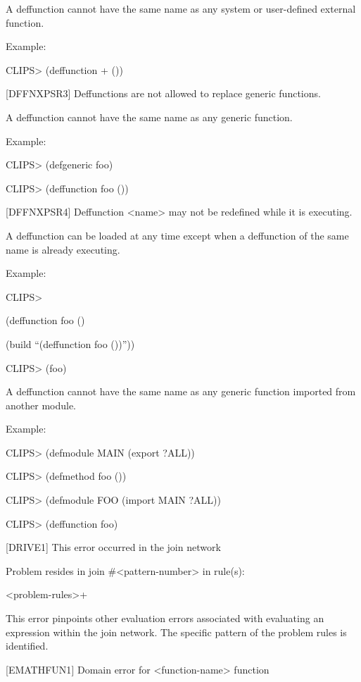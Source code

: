 \documentclass[letterpaper,10pt,english]{sphinxmanual}
\begin{document}
A deffunction cannot have the same name as any system or user-defined
external function.

Example:

CLIPS\textgreater{} (deffunction + ())

{[}DFFNXPSR3{]} Deffunctions are not allowed to replace generic functions.

A deffunction cannot have the same name as any generic function.

Example:

CLIPS\textgreater{} (defgeneric foo)

CLIPS\textgreater{} (deffunction foo ())

{[}DFFNXPSR4{]} Deffunction \textless{}name\textgreater{} may not be redefined while it is
executing.

A deffunction can be loaded at any time except when a deffunction of the
same name is already executing.

Example:

CLIPS\textgreater{}

(deffunction foo ()

(build “(deffunction foo ())”))

CLIPS\textgreater{} (foo)


A deffunction cannot have the same name as any generic function imported
from another module.

Example:

CLIPS\textgreater{} (defmodule MAIN (export ?ALL))

CLIPS\textgreater{} (defmethod foo ())

CLIPS\textgreater{} (defmodule FOO (import MAIN ?ALL))

CLIPS\textgreater{} (deffunction foo)

{[}DRIVE1{]} This error occurred in the join network

Problem resides in join \#\textless{}pattern-number\textgreater{} in rule(s):

\textless{}problem-rules\textgreater{}+

This error pinpoints other evaluation errors associated with evaluating
an expression within the join network. The specific pattern of the
problem rules is identified.

{[}EMATHFUN1{]} Domain error for \textless{}function-name\textgreater{} function
\end{document}
